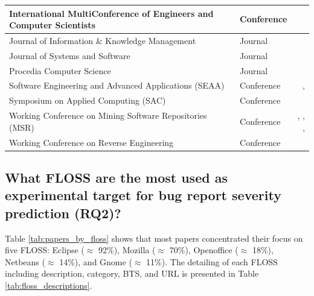 \begin{table}[h!]
\begin{tabular}{@{}llr@{}}
    \midrule
    International MultiConference of Engineers and Computer Scientists     & Conference     & \cite{Choeikiwong:2016}\\
    \midrule
    Journal of Information \& Knowledge Management                         & Journal         & \cite{Singh:2017}\\
    \midrule
    Journal of Systems and Software                 & Journal     & \cite{Zhang:2016}\\
    \midrule
    Procedia Computer Science                     & Journal     & \cite{Sharma:2015}\\
    \midrule
    Software Engineering and Advanced Applications (SEAA) & Conference & \cite{Roy:2014}, \cite{Roy:2017}\\
    \midrule
    Symposium on Applied Computing (SAC)         & Conference & \cite{Yang:2017}\\
    \midrule
    Working Conference on Mining Software Repositories (MSR) & Conference & \cite{Lamkanfi:2010}, \cite{Lamkanfi:2011}, \cite{Valdivia:2014}, \cite{Saha:2015}\\
    \midrule
    Working Conference on Reverse Engineering     & Conference & \cite{Tian:2012} \\
    \bottomrule
  \end{tabular}
  \label{tab:papers_sources}
\end{table}

\subsection{What FLOSS are the most used as experimental target for bug report severity prediction (RQ2)?}\label{subsec:rq2_result}

Table \ref{tab:papers_by_floss} shows that most papers concentrated their focus on five FLOSS: Eclipse ($\approx$ 92\%), Mozilla ($\approx$ 70\%), Openoffice ($\approx$ 18\%), Netbeans ($\approx$ 14\%), and Gnome ($\approx$ 11\%). The detailing of each FLOSS including description, category, BTS, and URL is presented in Table \ref{tab:floss_descriptions}.

